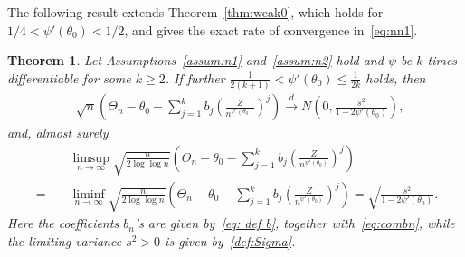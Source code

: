\documentclass[12pt]{amsart}
\theoremstyle{plain}
\newtheorem{theorem}{Theorem}[section]
\theoremstyle{remark}
\numberwithin{equation}{section}
\begin{document}
The following result extends Theorem~\ref{thm:weak0}, which holds for $1/4 < \psi'(\theta_0) < 1/2$, and gives the exact rate of convergence in~\eqref{eq:nn1}.

\begin{theorem}\label{thm:A2}
Let Assumptions~\ref{assum:n1} and~\ref{assum:n2} hold and $\psi$ be $k$-times differentiable for some $k \geq 2$. %
If further $\frac{1}{2(k+1)} < \psi'(\theta_0) \leq \frac{1}{2k}$ holds, 
then
\begin{align}\label{eq:suppwc}
& \sqrt{n}\left(\Theta_n - \theta_0 - \sum_{j = 1}^{k}b_j \left(\frac{Z}{n^{\psi'(\theta_0)}}\right)^j\right) %
\stackrel{d}{\to} {N}\left(0, \frac{s^2}{1-2 \psi'(\theta_0)}\right),
\end{align}
and, almost surely
\begin{align}\label{eq:supplil}
 &\limsup_{n\to \infty} \sqrt{\frac{n}{2\log\log n}}\left(\Theta_n - \theta_0 - \sum_{j = 1}^{k} b_j \left(\frac{Z}{n^{\psi'(\theta_0)}}\right)^j\right) \nonumber %
\\ =-& \liminf_{n\to \infty} \sqrt{\frac{n}{2\log\log n}}\left(\Theta_n - \theta_0 - \sum_{j = 1}^{k} b_j \left(\frac{Z}{n^{\psi'(\theta_0)}}\right)^j\right) = \sqrt{\frac{s^2}{1-2 \psi'(\theta_0)}}.%
\end{align}
Here the coefficients $b_n$'s are given by~\eqref{eq: def b}, together with~\eqref{eq:combn}, while the limiting variance $s^2>0$ is given by~\eqref{def:Sigma}.
\end{theorem}
\end{document}
